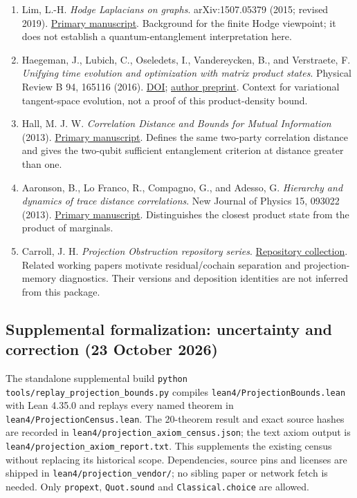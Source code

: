 \documentclass[
  11pt,
]{article}
\providecommand{\tightlist}{%
  \setlength{\itemsep}{0pt}\setlength{\parskip}{0pt}}
\providecommand{\tightlist}{%
  \setlength{\itemsep}{0pt}\setlength{\parskip}{0pt}}
\begin{document}
\begin{enumerate}
\def\labelenumi{\arabic{enumi}.}
\tightlist
\item
  Lim, L.-H. \emph{Hodge Laplacians on graphs}. arXiv:1507.05379 (2015; revised 2019).
  \href{https://arxiv.org/abs/1507.05379}{Primary manuscript}.
  Background for the finite Hodge viewpoint; it does not establish a
  quantum-entanglement interpretation here.
\item
  Haegeman, J., Lubich, C., Oseledets, I., Vandereycken, B., and Verstraete, F.
  \emph{Unifying time evolution and optimization with matrix product states}.
  Physical Review B 94, 165116 (2016).
  \href{https://doi.org/10.1103/PhysRevB.94.165116}{DOI};
  \href{https://arxiv.org/abs/1408.5056}{author preprint}.
  Context for variational tangent-space evolution, not a proof of this
  product-density bound.
\item
  Hall, M. J. W. \emph{Correlation Distance and Bounds for Mutual Information} (2013).
  \href{https://arxiv.org/html/1307.2697v1}{Primary manuscript}.
  Defines the same two-party correlation distance and gives the two-qubit
  sufficient entanglement criterion at distance greater than one.
\item
  Aaronson, B., Lo Franco, R., Compagno, G., and Adesso, G.
  \emph{Hierarchy and dynamics of trace distance correlations}.
  New Journal of Physics 15, 093022 (2013).
  \href{https://arxiv.org/abs/1307.3953}{Primary manuscript}.
  Distinguishes the closest product state from the product of marginals.
\item
  Carroll, J. H. \emph{Projection Obstruction repository series}.
  \href{https://github.com/dbccpage/theory_of_finite_quantum_mechanics/tree/main/papers}{Repository collection}.
  Related working papers motivate residual/cochain separation and
  projection-memory diagnostics. Their versions and deposition identities
  are not inferred from this package.
\end{enumerate}

\subsection{Supplemental formalization: uncertainty and correction (23 October 2026)}\label{supplemental-formalization-uncertainty-and-correction-23-october-2026}

The standalone supplemental build \texttt{python tools/\allowbreak{}replay\_\allowbreak{}projection\_\allowbreak{}bounds.py}
compiles \texttt{lean4/\allowbreak{}ProjectionBounds.lean} with Lean 4.35.0 and replays every named
theorem in \texttt{lean4/\allowbreak{}ProjectionCensus.lean}. The 20-theorem result and exact source
hashes are recorded in \texttt{lean4/\allowbreak{}projection\_\allowbreak{}axiom\_\allowbreak{}census.json}; the text axiom
output is \texttt{lean4/\allowbreak{}projection\_\allowbreak{}axiom\_\allowbreak{}report.txt}. This supplements the existing
census without replacing its historical scope. Dependencies, source pins and
licenses are shipped in \texttt{lean4/\allowbreak{}projection\_\allowbreak{}vendor/\allowbreak{}}; no sibling paper or network
fetch is needed. Only \texttt{propext}, \texttt{Quot.sound} and \texttt{Classical.choice} are allowed.
\end{document}
